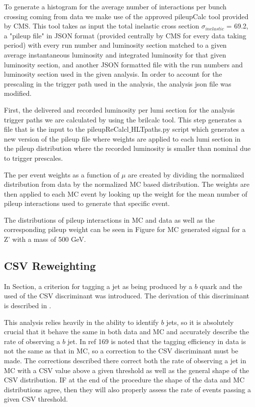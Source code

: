 To generate a histogram for the average number of interactions per bunch crossing coming from data we make use of the approved pileupCalc tool provided by CMS. This tool takes as input the total inelastic cross section $\sigma_{inelastic}$ = 69.2, a "pileup file" in JSON format (provided centrally by CMS for every data taking period) with every run number and luminosity section matched to a given average instantaneous luminosity and integrated luminosity for that given luminosity section, and another JSON formatted file with the run numbers and luminosity section used in the given analysis. In order to account for the prescaling in the trigger path used in the analysis, the analysis json file was modified.

First, the delivered and recorded luminosity per lumi section for the analysis trigger paths we are calculated by using the brilcalc tool. This step generates a file that is the input to the pileupReCalcl$\_$HLTpaths.py script which generates a new version of the pileup file where weights are applied to each lumi section in the pileup distribution where the recorded luminosity is smaller than nominal due to trigger prescales. 

The per event weights as a function of $\mu$ are created by dividing the normalized distribution from data by the normalized MC based distribution. The weights are then applied to each MC event by looking up the weight for the mean number of pileup interactions used to generate that specific event.

The distributions of pileup interactions in MC and data as well as the corresponding pileup weight can be seen in Figure for MC generated signal for a Z' with a mass of 500 GeV.

\subsection{CSV Reweighting}

In Section, a criterion for tagging a jet as being produced by a $b$ quark and the used of the CSV discriminant was introduced. The derivation of this discriminant is described in .%

This analysis relies heavily in the ability to identify $b$ jets, so it is absolutely crucial that it behave the same in both data and MC and accurately describe the rate of observing a $b$ jet. In ref 169 is noted that the tagging efficiency in data is not the same as that in MC, so a correction to the CSV discriminant must be made. The corrections described there correct both the rate of observing a jet in MC with a CSV value above a given threshold as well as the general shape of the CSV distribution. IF at the end of the procedure the shape of the data and MC distributions agree, then they will also properly assess the rate of events passing a given CSV threshold.

